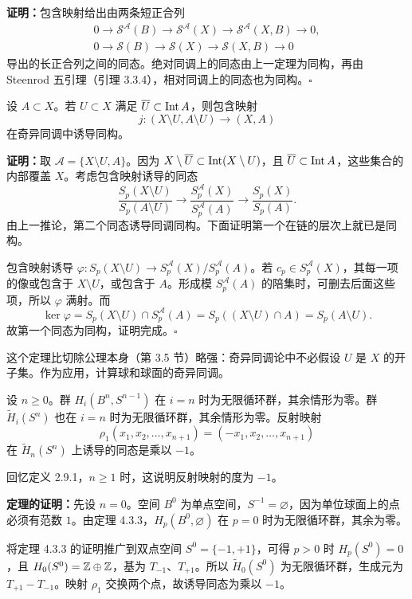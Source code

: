 \textbf{证明：}包含映射给出由两条短正合列
\begin{gather*}
0\longrightarrow\mathcal S^{\mathcal A}(B)\longrightarrow\mathcal S^{\mathcal A}(X)\longrightarrow\mathcal S^{\mathcal A}(X,B)\longrightarrow0,\\
0\longrightarrow\mathcal S(B)\longrightarrow\mathcal S(X)\longrightarrow\mathcal S(X,B)\longrightarrow0
\end{gather*}
导出的长正合列之间的同态。绝对同调上的同态由上一定理为同构，再由 Steenrod 五引理（引理 3.3.4），相对同调上的同态也为同构。\hfill$\square$

设 $A\subset X$。若 $U\subset X$ 满足 $\overline U\subset\operatorname{Int} A$，则包含映射
\[
j:(X\setminus U,A\setminus U)\to(X,A)
\]
在奇异同调中诱导同构。

\textbf{证明：}取 $\mathcal A=\{X\setminus U,A\}$。因为 $X\setminus\overline U\subset\operatorname{Int}(X\setminus U)$，且 $\overline U\subset\operatorname{Int} A$，这些集合的内部覆盖 $X$。考虑包含映射诱导的同态
\[
\frac{S_p(X\setminus U)}{S_p(A\setminus U)}\longrightarrow
\frac{S_p^{\mathcal A}(X)}{S_p^{\mathcal A}(A)}\longrightarrow
\frac{S_p(X)}{S_p(A)}.
\]
由上一推论，第二个同态诱导同调同构。下面证明第一个在链的层次上就已是同构。

包含映射诱导 $\varphi:S_p(X\setminus U)\to S_p^{\mathcal A}(X)/S_p^{\mathcal A}(A)$。若 $c_p\in S_p^{\mathcal A}(X)$，其每一项的像或包含于 $X\setminus U$，或包含于 $A$。形成模 $S_p^{\mathcal A}(A)$ 的陪集时，可删去后面这些项，所以 $\varphi$ 满射。而
\[
\ker\varphi=S_p(X\setminus U)\cap S_p^{\mathcal A}(A)
=S_p((X\setminus U)\cap A)=S_p(A\setminus U).
\]
故第一个同态为同构，证明完成。\hfill$\square$

这个定理比切除公理本身（第 3.5 节）略强：奇异同调论中不必假设 $U$ 是 $X$ 的开子集。作为应用，计算球和球面的奇异同调。

设 $n\ge0$。群 $H_i(B^n,S^{n-1})$ 在 $i=n$ 时为无限循环群，其余情形为零。群 $\widetilde H_i(S^n)$ 也在 $i=n$ 时为无限循环群，其余情形为零。反射映射
\[
\rho_1(x_1,x_2,\ldots,x_{n+1})=(-x_1,x_2,\ldots,x_{n+1})
\]
在 $\widetilde H_n(S^n)$ 上诱导的同态是乘以 $-1$。

回忆定义 2.9.1，$n\ge1$ 时，这说明反射映射的度为 $-1$。

\textbf{定理的证明：}先设 $n=0$。空间 $B^0$ 为单点空间，$S^{-1}=\varnothing$，因为单位球面上的点必须有范数 $1$。由定理 4.3.3，$H_p(B^0,\varnothing)$ 在 $p=0$ 时为无限循环群，其余为零。

将定理 4.3.3 的证明推广到双点空间 $S^0=\{-1,+1\}$，可得 $p>0$ 时 $H_p(S^0)=0$，且 $H_0(S^0)=\mathbb{Z}\oplus\mathbb{Z}$，基为 $T_{-1}$、$T_{+1}$。所以 $\widetilde H_0(S^0)$ 为无限循环群，生成元为 $T_{+1}-T_{-1}$。映射 $\rho_1$ 交换两个点，故诱导同态为乘以 $-1$。

